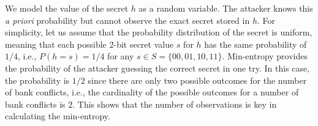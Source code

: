 %
We model the value of the secret $h$ as a random variable.
%
The attacker knows this \textit{a priori} probability but cannot 
observe the exact secret stored in $h$.
%
For simplicity, let us assume that the probability distribution of the secret is uniform,
meaning that each possible 2-bit secret value $s$ for $h$ has the same probability of $1/4$, i.e., $P(h=s)= 1/4$ for any $s\in S=\{00,01,10,11\}$.
%
%
Min-entropy provides the probability of the attacker guessing the correct secret in one try.
%
In this case, the probability is $1/2$ since there are only two possible outcomes for the number of bank conflicts, i.e., the cardinality of the possible outcomes for a number of bank conflicts is $2$.
%
This shows that the number of observations is key in calculating the min-entropy.


